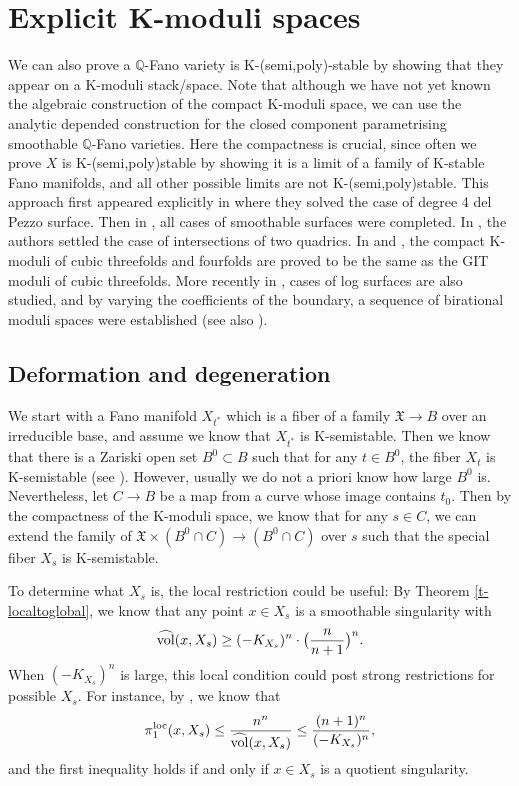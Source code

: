 \documentclass[12pt,reqno]{amsart}%
\newcommand{\kX}{{\mathfrak{X}}}
\theoremstyle{definition}
\theoremstyle{remark}
\newcommand{\hvol}{\widehat{\rm vol}}
\begin{document}
\section{Explicit K-moduli spaces}\label{s-moduli}
We can also prove a $\mathbb{Q}$-Fano variety is K-(semi,poly)-stable by showing that they appear on a K-moduli stack/space.
Note that although we have not yet known the algebraic construction of the compact K-moduli space, we can use the analytic depended construction \cite{LWX19}  for the closed component parametrising smoothable $\mathbb{Q}$-Fano varieties.  Here the compactness is crucial, since often we prove $X$ is K-(semi,poly)stable by showing it is a limit of a family of K-stable Fano manifolds, and all other possible limits are not K-(semi,poly)stable. This approach first  appeared explicitly in \cite{MM93} where they solved the case of degree 4 del Pezzo surface. Then in \cite{OSS16}, all cases of smoothable surfaces were completed. In \cite{SS17}, the authors settled the case of intersections of two quadrics. In \cite{LX19} and \cite{Liu20}, the compact K-moduli of cubic threefolds and fourfolds are proved to be the same as the GIT moduli of cubic threefolds.   More recently in \cite{ADL19,ADL20}, cases of log surfaces are also studied, and by varying the coefficients of the boundary, a sequence of birational moduli spaces were established (see also \cite{GMS18}). 

\subsection{Deformation and degeneration}\label{ss-compactmoduli}
 We start with a Fano manifold $X_{t^*}$ which is a fiber of a family $\kX\to B$ over an irreducible base, and assume we know that $X_{t^*}$ is K-semistable. Then we know that there is a Zariski open set $B^0\subset B$ such that for any $t\in B^0$, the fiber $X_t$ is K-semistable (see \cite{BLX19, Xu19}). However, usually we do not a priori know how large $B^0$ is. Nevertheless, let  $C\to B$ be a map from a curve  whose  image contains $t_0$. Then by the compactness of the K-moduli space, we know that for any $s\in C$, we can extend the family of $\kX\times (B^0\cap C)\to (B^0\cap C)$ over $s$ such that the special fiber $X_{s}$ is K-semistable.  

To determine what $X_s$ is, the local restriction could be useful:
By Theorem \ref{t-localtoglobal}, we know that any point $x\in X_{s}$ is a smoothable singularity with  
\begin{eqnarray}\label{e-localglobal}
 \hvol(x, X_{s})\ge (-K_{X_{s}})^n\cdot \big(\frac{n}{n+1}\big)^n.
 \end{eqnarray}
When $(-K_{X_{s}})^n$ is large, this local condition could post strong restrictions for possible $X_{s}$. For instance, by \cite{LX18, XZ20}, we know that 
\begin{eqnarray}\label{e-cover}
{\pi}_1^{\rm loc}(x, X_{s})\le \frac{n^n}{\hvol(x, X_{s})}\le \frac{(n+1)^n}{(-K_{X_{s}})^n},
\end{eqnarray}
and the first inequality holds if and only if $x\in X_{s}$ is a quotient singularity. 
\end{document}
